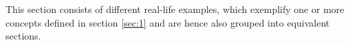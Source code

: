This section consists of different real-life examples, which exemplify one or more concepts defined in section \ref{sec:1} and are hence also grouped into equivalent sections.